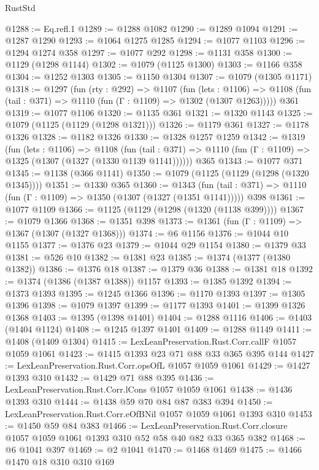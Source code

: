 \begin{lexlean}{RustStd}
\begin{coremodule}
{\begin{coremodule}
{{{{{{{{{{@1288 := Eq.refl.{1}
@1289 := @1288 @1082
@1290 := @1289 @1094
@1291 := @1287 @1290
@1293 := @1064 @1275 @1285
@1294 := @1077 @1103
@1296 := @1294 @1274 @358
@1297 := @1077 @292
@1298 := @1131 @358
@1300 := @1129 (@1298 @1144)
@1302 := @1079 (@1125 @1300)
@1303 := @1166 @358
@1304 := @1252 @1303
@1305 := @1150 @1304
@1307 := @1079 (@1305 @1171)
@1318 := @1297
    (fun (rty : @292) =>
    @1107
      (fun (lets : @1106) =>
      @1108 (fun (tail : @371) => @1110 (fun (Γ : @1109) => @1302 (@1307 @1263)))))
    @361
@1319 := @1077 @1106
@1320 := @1135 @361
@1321 := @1320 @1143
@1325 := @1079 (@1125 (@1129 (@1298 @1321)))
@1326 := @1179 @361
@1327 := @1178 @1326
@1328 := @1182 @1326
@1330 := @1328 @1257 @1259
@1342 := @1319
    (fun (lets : @1106) =>
    @1108
      (fun (tail : @371) => @1110 (fun (Γ : @1109) => @1325 (@1307 (@1327 (@1330 @1139 @1141))))))
    @365
@1343 := @1077 @371
@1345 := @1138 (@366 @1141)
@1350 := @1079 (@1125 (@1129 (@1298 (@1320 @1345))))
@1351 := @1330 @365
@1360 := @1343
    (fun (tail : @371) => @1110 (fun (Γ : @1109) => @1350 (@1307 (@1327 (@1351 @1141)))))
    @398
@1361 := @1077 @1109
@1366 := @1125 (@1129 (@1298 (@1320 (@1138 @399))))
@1367 := @1079 @1366
@1368 := @1351 @398
@1373 := @1361 (fun (Γ : @1109) => @1367 (@1307 (@1327 @1368)))
@1374 := @6 @1156
@1376 := @1044 @10 @1155
@1377 := @1376 @23
@1379 := @1044 @29 @1154
@1380 := @1379 @33
@1381 := @526 @10
@1382 := @1381 @23
@1385 := @1374 (@1377 (@1380 @1382))
@1386 := @1376 @18
@1387 := @1379 @36
@1388 := @1381 @18
@1392 := @1374 (@1386 (@1387 @1388)) @1157
@1393 := @1385 @1392
@1394 := @1373 @1393
@1395 := @1245 @1366
@1396 := @1170 @1393
@1397 := @1305 @1396
@1398 := @1079 @1397
@1399 := @1177 @1393
@1401 := @1399 @1326 @1368
@1403 := @1395 (@1398 @1401)
@1404 := @1288 @1116
@1406 := @1403 (@1404 @1124)
@1408 := @1245 @1397 @1401
@1409 := @1288 @1149
@1411 := @1408 (@1409 @1304)
@1415 := LexLeanPreservation.Rust.Corr.callF @1057 @1059 @1061
@1423 := @1415 @1393 @23 @71 @88 @33 @365 @395 @144
@1427 := LexLeanPreservation.Rust.Corr.opsOfL @1057 @1059 @1061
@1429 := @1427 @1393 @310
@1432 := @1429 @71 @88 @395
@1436 := LexLeanPreservation.Rust.Corr.lCons @1057 @1059 @1061
@1438 := @1436 @1393 @310
@1444 := @1438 @59 @70 @84 @87 @383 @394
@1450 := LexLeanPreservation.Rust.Corr.eOfBNil @1057 @1059 @1061 @1393 @310
@1453 := @1450 @59 @84 @383
@1466 := LexLeanPreservation.Rust.Corr.closure
    @1057
    @1059
    @1061
    @1393
    @310
    @52
    @58
    @40
    @82
    @33
    @365
    @382
@1468 := @6 @1041 @397
@1469 := @2 @1041
@1470 := @1468 @1469
@1475 := @1466 @1470 @18 @310 @310 @169
}}}}}}}}}}
\end{coremodule}}
\end{coremodule}
\end{lexlean}
